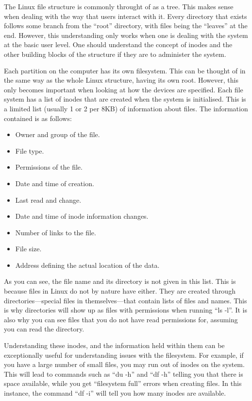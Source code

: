 				The Linux file structure is commonly throught of as a tree.
				This makes sense when dealing with the way that users interact with it.
				Every directory that exists follows some branch from the ``root'' directory, with files being the ``leaves'' at the end.
				However, this understanding only works when one is dealing with the system at the basic user level.
				One should understand the concept of inodes and the other building blocks of the structure if they are to administer the system.

				Each partition on the computer has its own filesystem.
				This can be thought of in the same way as the whole Linux structure, having its own root.
				However, this only becomes important when looking at how the devices are specified.
				Each file system has a list of inodes that are created when the system is initialised.
				This is a limited list (usually 1 or 2 per 8KB) of information about files.
				The information contained is as follows:
				\begin{itemize}
					\item Owner and group of the file.
					\item File type.
					\item Permissions of the file.
					\item Date and time of creation.
					\item Last read and change.
					\item Date and time of inode information changes.
					\item Number of links to the file.
					\item File size.
					\item Address defining the actual location of the data.
				\end{itemize}

				As you can see, the file name and its directory is not given in this list.
				This is because files in Linux do not by nature have either.
				They are created through directories---special files in themselves---that contain lists of files and names.
				This is why directories will show up as files with permissions when running ``ls -l''.
				It is also why you can see files that you do not have read permissions for, assuming you can read the directory.

				Understanding these inodes, and the information held within them can be exceptionally useful for understanding issues with the filesystem.
				For example, if you have a large number of small files, you may run out of inodes on the system.
				This will lead to commands such as ``du -h'' and ``df -h'' telling you that there is space available, while you get ``filesystem full'' errors when creating files.
				In this instance, the command ``df -i'' will tell you how many inodes are available.

